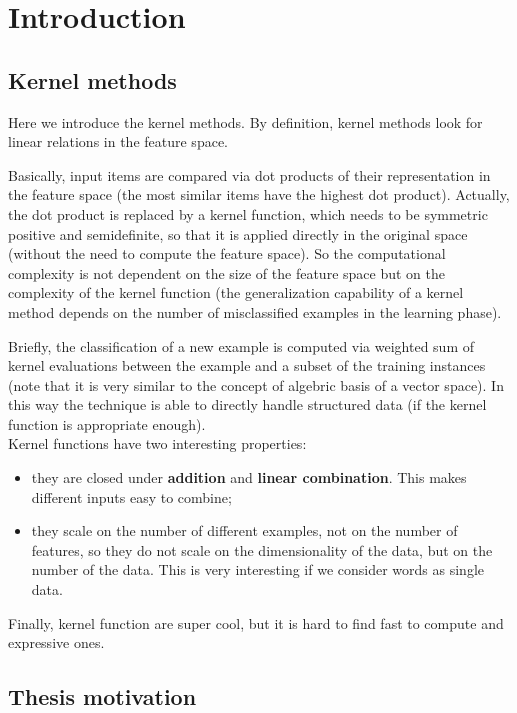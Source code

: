 \section{Introduction}

\subsection{Kernel methods}

Here we introduce the kernel methods. By definition, kernel methods look for
linear relations in the feature space.

Basically, input items are compared via dot products of their representation in
the feature space (the most similar items have the highest dot product).
Actually, the dot product is replaced by a kernel function, which needs to be
symmetric positive and semidefinite, so that it is applied directly in the
original space (without the need to compute the feature space). So the
computational complexity is not dependent on the size of the feature space but
on the complexity of the kernel function (the generalization capability of a
kernel method depends on the number of misclassified examples in the learning
phase).

Briefly, the classification of a new example is computed via weighted sum of
kernel evaluations between the example and a subset of the training instances
(note that it is very similar to the concept of algebric basis of a vector 
space). 
In this way the technique is able to directly handle structured data (if the 
kernel function is appropriate enough).\\
Kernel functions have two interesting properties:
\begin{itemize}
	\item they are closed under \textbf{addition} and \textbf{linear
		combination}. This makes different inputs easy to combine;

	\item they scale on the number of different examples, not on the number of
		features, so they do not scale on the dimensionality of the data, but on 
		the number of the data. This is very interesting if we consider 
		words as single data.
\end{itemize}

Finally, kernel function are super cool, but it is hard to find fast to compute
and expressive ones.

\subsection{Thesis motivation}

